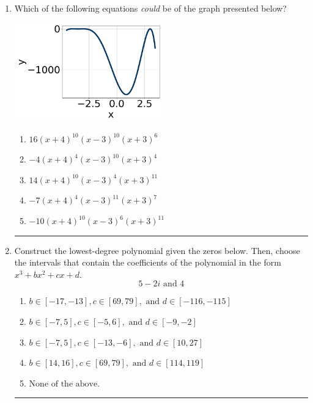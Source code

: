 \documentclass[14pt]{extbook}
\newcommand{\litem}[1]{\item#1\hspace*{-1cm}\rule{\textwidth}{0.4pt}}
\begin{document}
\begin{enumerate}
{\begin{enumerate}[label=\Alph*.]
\end{enumerate} }
\litem{
Which of the following equations \textit{could} be of the graph presented below?
\begin{center}
    \includegraphics[width=0.5\textwidth]{../Figures/polyGraphToFunctionC.png}
\end{center}
\begin{enumerate}[label=\Alph*.]
\item \( 16(x + 4)^{10} (x - 3)^{10} (x + 3)^{6} \)
\item \( -4(x + 4)^{4} (x - 3)^{10} (x + 3)^{4} \)
\item \( 14(x + 4)^{10} (x - 3)^{4} (x + 3)^{11} \)
\item \( -7(x + 4)^{4} (x - 3)^{11} (x + 3)^{7} \)
\item \( -10(x + 4)^{10} (x - 3)^{6} (x + 3)^{11} \)

\end{enumerate} }
\litem{
Construct the lowest-degree polynomial given the zeros below. Then, choose the intervals that contain the coefficients of the polynomial in the form $x^3+bx^2+cx+d$.\[ 5 - 2 i \text{ and } 4 \]\begin{enumerate}[label=\Alph*.]
\item \( b \in [-17, -13], c \in [69, 79], \text{ and } d \in [-116, -115] \)
\item \( b \in [-7, 5], c \in [-5, 6], \text{ and } d \in [-9, -2] \)
\item \( b \in [-7, 5], c \in [-13, -6], \text{ and } d \in [10, 27] \)
\item \( b \in [14, 16], c \in [69, 79], \text{ and } d \in [114, 119] \)
\item \( \text{None of the above.} \)


\end{enumerate}}
\end{enumerate}
\end{document}
